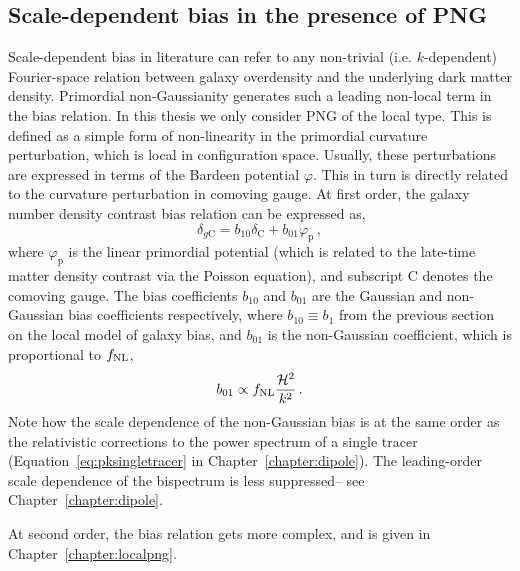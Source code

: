 \subsection{Scale-dependent bias in the presence of PNG}
Scale-dependent bias in literature can refer to any non-trivial (i.e. $k$-dependent) Fourier-space relation between galaxy overdensity and the underlying dark matter density. Primordial non-Gaussianity generates such a leading non-local term in the bias relation. In this thesis we only consider PNG of the local type. This is defined as a simple form of non-linearity in the primordial curvature perturbation, which is local in configuration space. Usually, these perturbations are expressed in terms of the Bardeen potential $\varphi$. This in turn is directly related to the curvature perturbation in comoving gauge. At first order, the galaxy number density contrast bias relation can be expressed as, 
\begin{equation}
	\delta_{g\mathrm{C}} = b_{10} \delta_\mathrm{C} + b_{01} \varphi_\mathrm{p}\,,
\end{equation}
where $\varphi_\mathrm{p}$ is the linear primordial potential (which is related to the late-time matter density contrast via the Poisson equation), and subscript C denotes the comoving gauge. The bias coefficients $b_{10}$ and $b_{01}$ are the Gaussian and non-Gaussian bias coefficients respectively, where $b_{10} \equiv b_1$ from the previous section on the local model of galaxy bias, and $b_{01}$ is the non-Gaussian coefficient, which is proportional to $f_\text{NL}$, 
\begin{equation}
	b_{01} \propto f_\text{NL} \frac{\mathcal{H}^2}{k^2}\,.
\end{equation}
Note how the scale dependence of the non-Gaussian bias is at the same order as the relativistic corrections to the power spectrum of a single tracer (Equation~\ref{eq:pksingletracer} in Chapter~\ref{chapter:dipole}). The leading-order scale dependence of the bispectrum is less suppressed-- see Chapter~\ref{chapter:dipole}.

At second order, the bias relation gets more complex, and is given in Chapter~\ref{chapter:localpng}. 


